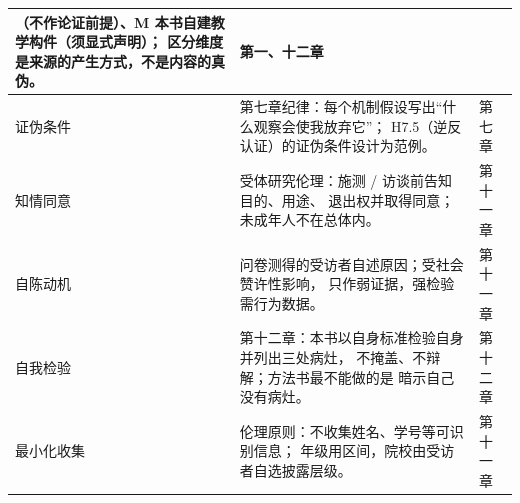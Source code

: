 \begin{longtable}{@{}p{3.0cm}p{9.2cm}p{1.8cm}@{}}
    （不作论证前提）、M 本书自建教学构件（须显式声明）；
    区分维度是来源的产生方式，不是内容的真伪。 &
    第一、十二章 \\ \midrule
  证伪条件 &
    第七章纪律：每个机制假设写出“什么观察会使我放弃它”；
    H7.5（逆反认证）的证伪条件设计为范例。 &
    第七章 \\ \midrule
  知情同意 &
    受体研究伦理：施测 / 访谈前告知目的、用途、
    退出权并取得同意；未成年人不在总体内。 &
    第十一章 \\ \midrule
  自陈动机 &
    问卷测得的受访者自述原因；受社会赞许性影响，
    只作弱证据，强检验需行为数据。 &
    第十一章 \\ \midrule
  自我检验 &
    第十二章：本书以自身标准检验自身并列出三处病灶，
    不掩盖、不辩解；方法书最不能做的是
    暗示自己没有病灶。 &
    第十二章 \\ \midrule
  最小化收集 &
    伦理原则：不收集姓名、学号等可识别信息；
    年级用区间，院校由受访者自选披露层级。 &
    第十一章 \\ \bottomrule
\end{longtable}
